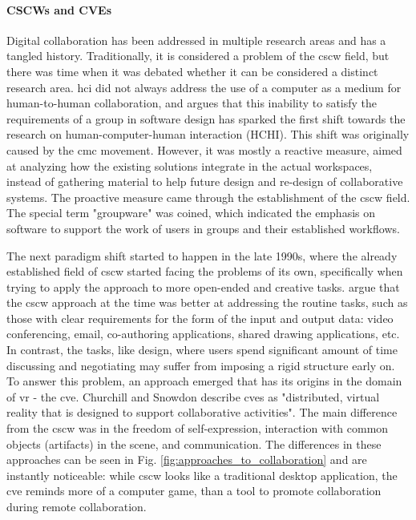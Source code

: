 


\paragraph[]{CSCWs and CVEs} %
Digital collaboration has been addressed in multiple research areas and has a tangled history. Traditionally, it is considered a problem of the \gls{cscw} field, but there was time when it was debated whether it can be considered a distinct research area. 
\gls{hci} did not always address the use of a computer as a medium for human-to-human collaboration, and \cite{bannon_perspectives_nodate} argues that this inability to satisfy the requirements of a group in software design has sparked the first shift towards the research on human-computer-human interaction (HCHI). 
This shift was originally caused by the \gls{cmc} movement. However, it was mostly a reactive measure, aimed at analyzing how the existing solutions integrate in the actual workspaces, instead of gathering material to help future design and re-design of collaborative systems. The proactive measure came through the establishment of the \gls{cscw} field. The special term "groupware" was coined, which indicated the emphasis on software to support the work of users in groups and their established workflows.

The next paradigm shift started to happen in the late 1990s, where the already established field of \gls{cscw} started facing the problems of its own, specifically when trying to apply the approach to more open-ended and creative tasks. \cite{churchill_collaborative_1998} argue that the \gls{cscw} approach at the time was better at addressing the routine tasks, such as those with clear requirements for the form of the input and output data: video conferencing, email, co-authoring applications, shared drawing applications, etc. In contrast, the tasks, like design, where users spend significant amount of time discussing and negotiating may suffer from imposing a rigid structure early on. To answer this problem, an approach emerged that has its origins in the domain of \gls{vr} - the \gls{cve}. Churchill and Snowdon describe \gls{cve}s as "distributed, virtual reality that is designed to support collaborative activities". The main difference from the \gls{cscw} was in the freedom of self-expression, interaction with common objects (artifacts) in the scene, and communication. The differences in these approaches can be seen in Fig. \ref{fig:approaches_to_collaboration} and are instantly noticeable: while \gls{cscw} looks like a traditional desktop application, the \gls{cve} reminds more of a computer game, than a tool to promote collaboration during remote collaboration. 

